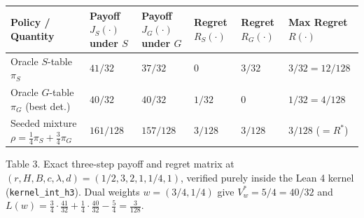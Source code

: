 \documentclass[11pt,a4paper]{article}
\newcounter{none}
\begin{document}
{\def\LTcaptype{none} %
\begin{longtable}[]{@{}
  >{\raggedright\arraybackslash}p{}
  >{\raggedleft\arraybackslash}p{}
  >{\raggedleft\arraybackslash}p{}
  >{\raggedleft\arraybackslash}p{}
  >{\raggedleft\arraybackslash}p{}
  >{\raggedleft\arraybackslash}p{}@{}}
\toprule\noalign{}
\begin{minipage}[b]{\linewidth}\raggedright
Policy / Quantity
\end{minipage} & \begin{minipage}[b]{\linewidth}\raggedleft
Payoff \(J_S(\cdot)\) under \(S\)
\end{minipage} & \begin{minipage}[b]{\linewidth}\raggedleft
Payoff \(J_G(\cdot)\) under \(G\)
\end{minipage} & \begin{minipage}[b]{\linewidth}\raggedleft
Regret \(R_S(\cdot)\)
\end{minipage} & \begin{minipage}[b]{\linewidth}\raggedleft
Regret \(R_G(\cdot)\)
\end{minipage} & \begin{minipage}[b]{\linewidth}\raggedleft
Max Regret \(R(\cdot)\)
\end{minipage} \\
\midrule\noalign{}
\endhead
\bottomrule\noalign{}
\endlastfoot
Oracle \(S\)-table \(\pi_S\) & \(41/32\) & \(37/32\) & \(0\) & \(3/32\)
& \(3/32 = 12/128\) \\
Oracle \(G\)-table \(\pi_G\) (best det.) & \(40/32\) & \(40/32\) &
\(1/32\) & \(0\) & \(1/32 = 4/128\) \\
Seeded mixture \(\rho = \frac{1}{4}\pi_S + \frac{3}{4}\pi_G\) &
\(161/128\) & \(157/128\) & \(3/128\) & \(3/128\) & \textbf{\(3/128\)}
(\(= R^*\)) \\
\end{longtable}
}

Table 3. Exact three-step payoff and regret matrix at
\((r, H, B, c, \lambda, d) = (1/2, 3, 2, 1, 1/4, 1)\), verified purely
inside the Lean 4 kernel (\texttt{kernel\_int\_h3}). Dual weights
\(w = (3/4, 1/4)\) give \(V_w^* = 5/4 = 40/32\) and
\(L(w) = \frac{3}{4}\cdot\frac{41}{32} + \frac{1}{4}\cdot\frac{40}{32} - \frac{5}{4} = \frac{3}{128}\).
\end{document}
